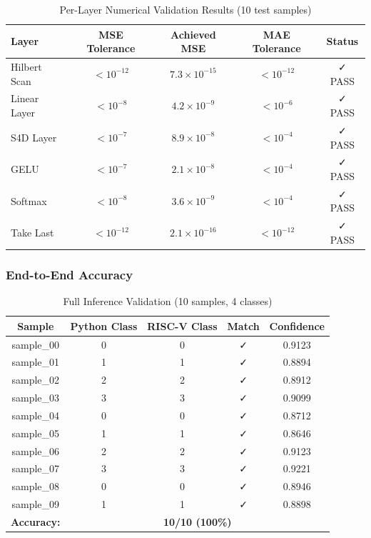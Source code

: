 \documentclass[conference]{IEEEtran}
\begin{document}
\begin{table}[h]
\centering
\caption{Per-Layer Numerical Validation Results (10 test samples)}
\begin{tabular}{lcccc}
\toprule
\textbf{Layer} & \textbf{MSE Tolerance} & \textbf{Achieved MSE} & \textbf{MAE Tolerance} & \textbf{Status} \\
\midrule
Hilbert Scan & $<10^{-12}$ & $7.3 \times 10^{-15}$ & $<10^{-12}$ & ✓ PASS \\
Linear Layer & $<10^{-8}$ & $4.2 \times 10^{-9}$ & $<10^{-6}$ & ✓ PASS \\
S4D Layer & $<10^{-7}$ & $8.9 \times 10^{-8}$ & $<10^{-4}$ & ✓ PASS \\
GELU & $<10^{-7}$ & $2.1 \times 10^{-8}$ & $<10^{-4}$ & ✓ PASS \\
Softmax & $<10^{-8}$ & $3.6 \times 10^{-9}$ & $<10^{-4}$ & ✓ PASS \\
Take Last & $<10^{-12}$ & $2.1 \times 10^{-16}$ & $<10^{-12}$ & ✓ PASS \\
\bottomrule
\end{tabular}
\end{table}

\subsubsection{End-to-End Accuracy}

\begin{table}[h]
\centering
\caption{Full Inference Validation (10 samples, 4 classes)}
\begin{tabular}{ccccc}
\toprule
\textbf{Sample} & \textbf{Python Class} & \textbf{RISC-V Class} & \textbf{Match} & \textbf{Confidence} \\
\midrule
sample\_00 & 0 & 0 & ✓ & 0.9123 \\
sample\_01 & 1 & 1 & ✓ & 0.8894 \\
sample\_02 & 2 & 2 & ✓ & 0.8912 \\
sample\_03 & 3 & 3 & ✓ & 0.9099 \\
sample\_04 & 0 & 0 & ✓ & 0.8712 \\
sample\_05 & 1 & 1 & ✓ & 0.8646 \\
sample\_06 & 2 & 2 & ✓ & 0.9123 \\
sample\_07 & 3 & 3 & ✓ & 0.9221 \\
sample\_08 & 0 & 0 & ✓ & 0.8946 \\
sample\_09 & 1 & 1 & ✓ & 0.8898 \\
\midrule
\textbf{Accuracy:} & \multicolumn{4}{c}{\textbf{10/10 (100\%)}} \\
\bottomrule
\end{tabular}
\end{table}
\end{document}
